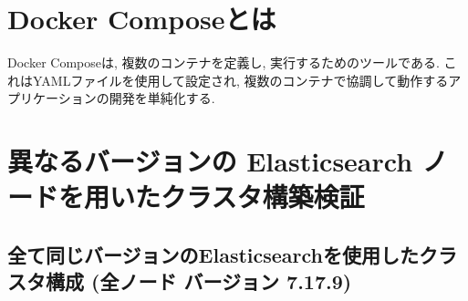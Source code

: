 \section{Docker Composeとは}
Docker Composeは, 複数のコンテナを定義し, 実行するためのツールである. これはYAMLファイルを使用して設定され, 複数のコンテナで協調して動作するアプリケーションの開発を単純化する.

\section{異なるバージョンの Elasticsearch ノードを用いたクラスタ構築検証}
\subsection{全て同じバージョンのElasticsearchを使用したクラスタ構成 (全ノード バージョン 7.17.9)}


  


